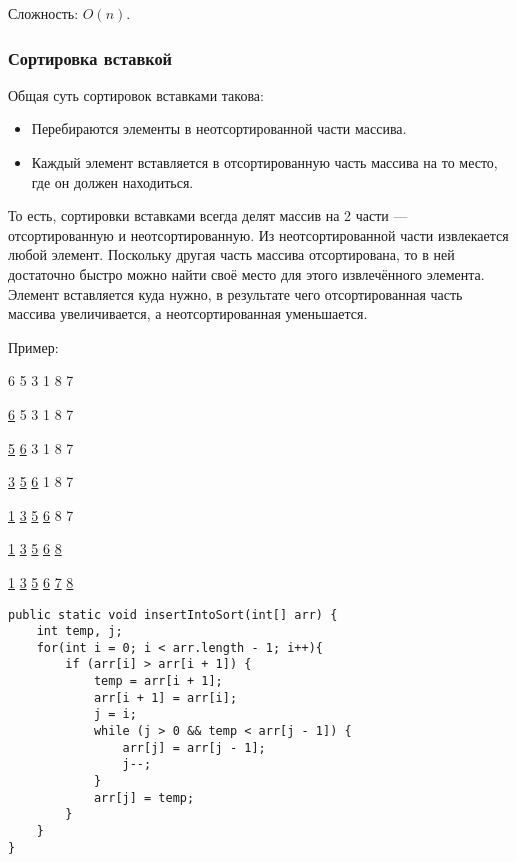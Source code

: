 \documentclass[12pt]{matmex-diploma}
\begin{document}
                    Сложность: $O(n)$.
            
        \subsubsection*{Сортировка вставкой}
        
            Общая суть сортировок вставками такова:
            \begin{itemize}
                \item Перебираются элементы в неотсортированной части массива.
                \item Каждый элемент вставляется в отсортированную часть массива на то место, где он должен находиться.
            \end{itemize}

            То есть, сортировки вставками всегда делят массив на 2 части — отсортированную и неотсортированную. Из неотсортированной части извлекается любой элемент. Поскольку другая часть массива отсортирована, то в ней достаточно быстро можно найти своё место для этого извлечённого элемента. Элемент вставляется куда нужно, в результате чего отсортированная часть массива увеличивается, а неотсортированная уменьшается.
            
            Пример:
            
            6 5 3 1 8 7
            
            \underline{6} 5 3 1 8 7
            
            \underline{5} \underline{6} 3 1 8 7
            
            \underline{3} \underline{5} \underline{6} 1 8 7
            
            \underline{1} \underline{3} \underline{5} \underline{6} 8 7
            
            \underline{1} \underline{3} \underline{5} \underline{6} \underline{8}
            
            \underline{1} \underline{3} \underline{5} \underline{6} \underline{7} \underline{8}
            
            \begin{verbatim}
public static void insertIntoSort(int[] arr) {
    int temp, j;
    for(int i = 0; i < arr.length - 1; i++){
        if (arr[i] > arr[i + 1]) {
            temp = arr[i + 1];
            arr[i + 1] = arr[i];      
            j = i;
            while (j > 0 && temp < arr[j - 1]) {
                arr[j] = arr[j - 1];               
                j--;
            }
            arr[j] = temp;             
        }        
    }
}
            \end{verbatim}
            
\end{document}
